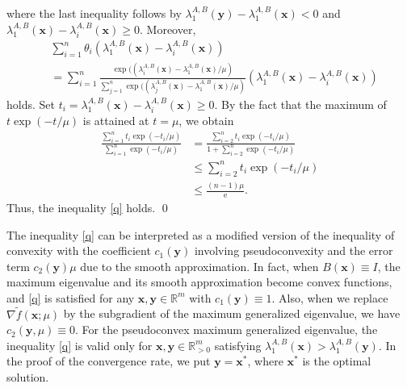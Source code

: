 \documentclass[sn-mathphys,Numbered]{sn-jnl}%
\theoremstyle{thmstyleone}%
\theoremstyle{thmstyletwo}%
\theoremstyle{thmstylethree}%
\newcommand{\prn}[1]{\left(#1\right)}
\def\rm{\mathbb{R}^m}
\def\tp{\mathrm{T}}
\def\lamx{\lambda^{A,B}_1(\boldsymbol{x})}
\def\lamxi{\lambda^{A,B}_i(\boldsymbol{x})}
\def\lamxj{\lambda^{A,B}_j(\boldsymbol{x})}
\def\lamy{\lambda^{A,B}_1(\boldsymbol{y})}
\begin{document}
where the last inequality follows by $\lamy-\lamx<0$ and $\lamx-\lamxi\ge 0$. Moreover,
\begin{align}
& \sum_{i=1}^n \theta_i\left(\lamx-\lamxi\right)\\
& = \sum_{i=1}^n \frac{\exp((\lamxi-\lamx/\mu)}{\sum_{j=1}^n \exp((\lamxj-\lamx/\mu)}\left(\lamx-\lamxi\right)
\end{align}
holds. Set $t_i=\lamx-\lamxi\ge 0$. By the fact that the maximum of $t\exp(-t/\mu)$ is attained at $t=\mu$, we obtain
\begin{align}
\frac{\sum_{i=1}^n t_i\exp(-t_i/\mu)}{\sum_{i=1}^n \exp(-t_i/\mu)}
& = \frac{\sum_{i=2}^n t_i\exp(-t_i/\mu)}{1+\sum_{i=2}^n \exp(-t_i/\mu)}\\
& \le \sum_{i=2}^n t_i\exp(-t_i/\mu)\\
& \le \frac{(n-1)\mu}{\mathrm{e}}.
\end{align}
Thus, the inequality \eqref{q} holds.
\qed

The inequality \eqref{q} can be interpreted as a modified version of the inequality of convexity with the coefficient $c_1(\bm{y})$ involving pseudoconvexity and the error term $c_2(\bm{y})\mu$ due to the smooth approximation. In fact, when $B(\bm{x})\equiv I$, the maximum eigenvalue and its smooth approximation become convex functions, and \eqref{q} is satisfied for any $\bm{x},\bm{y}\in\rm$ with $c_1(\bm{y})\equiv 1$. Also, when we replace $\nabla\tilde{f}(\bm{x};\mu)$ by the subgradient of the maximum generalized eigenvalue, we have $c_2(\bm{y},\mu)\equiv 0$. For the pseudoconvex maximum generalized eigenvalue, the inequality \eqref{q} is valid only for $\bm{x},\bm{y}\in\mathbb{R}^m_{>0}$ satisfying $\lamx>\lamy$. In the proof of the convergence rate, we put $\bm{y}=\bm{x}^*$, where $\bm{x}^*$ is the optimal solution.
\end{document}
